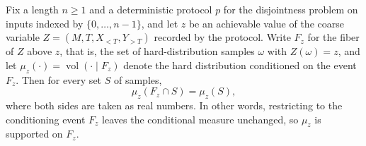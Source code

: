 \begin{theorem}
\label{CommunicationComplexity.Functions.Disjointness.RandomizedLowerBound.zFiberMeasure_inter_fiber}
\leanok
{}
Fix a length $n \ge 1$ and a deterministic protocol $p$ for the disjointness problem on
inputs indexed by $\{0,\dots,n-1\}$, and let $z$ be an achievable value of the coarse
variable $Z = (M, T, X_{<T}, Y_{>T})$ recorded by the protocol. Write $F_z$ for the
fiber of $Z$ above $z$, that is, the set of hard-distribution samples $\omega$ with
$Z(\omega) = z$, and let $\mu_z(\cdot) = \operatorname{vol}(\cdot \mid F_z)$ denote the
hard distribution conditioned on the event $F_z$. Then for every set $S$ of samples,
\[
  \mu_z(F_z \cap S) = \mu_z(S),
\]
where both sides are taken as real numbers. In other words, restricting to the
conditioning event $F_z$ leaves the conditional measure unchanged, so $\mu_z$ is
supported on $F_z$.
\end{theorem}

